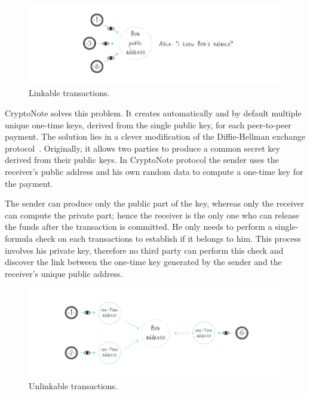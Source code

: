 \begin{figure}[H]
  \centering
  \includegraphics[width=0.9 \columnwidth,keepaspectratio]{Images/CryptoNote/linkable.png}
  \caption{Linkable transactions.~\cite{cryptonote}}
  \label{fig:linkable}
\end{figure}

CryptoNote solves this problem. It creates automatically and by default multiple unique one-time keys, derived from the single public key, for each peer-to-peer payment. The solution lies in a clever modification of the Diffie-Hellman exchange protocol~\cite{Diffie:2006:NDC:2263321.2269104}. Originally, it allows two parties to produce a common secret key derived from their public keys. In CryptoNote protocol the sender uses the receiver's public address and his own random data to compute a one-time key for the payment.

The sender can produce only the public part of the key, whereas only the receiver can compute the private part; hence the receiver is the only one who can release the funds after the transaction is committed. He only needs to perform a single-formula check on each transactions to establish if it belongs to him. This process involves his private key, therefore no third party can perform this check and discover the link between the one-time key generated by the sender and the receiver's unique public address.

\begin{figure}[ht]
  \centering
  \includegraphics[width=0.9 \columnwidth,keepaspectratio]{Images/CryptoNote/unlinkable.png}
  \caption{Unlinkable transactions.~\cite{cryptonote}}
  \label{fig:unlinkable}
\end{figure}

